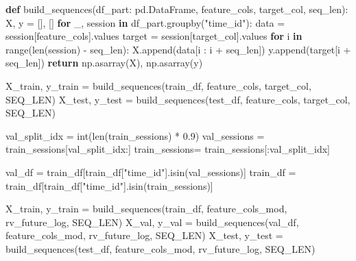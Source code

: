 \documentclass[
  letterpaper,
  DIV=11,
  numbers=noendperiod]{scrartcl}
\newenvironment{Shaded}{\begin{snugshade}}{\end{snugshade}}
\newcommand{\BuiltInTok}[1]{\textcolor[rgb]{0.00,0.23,0.31}{#1}}
\newcommand{\ControlFlowTok}[1]{\textcolor[rgb]{0.00,0.23,0.31}{\textbf{#1}}}
\newcommand{\FloatTok}[1]{\textcolor[rgb]{0.68,0.00,0.00}{#1}}
\newcommand{\KeywordTok}[1]{\textcolor[rgb]{0.00,0.23,0.31}{\textbf{#1}}}
\newcommand{\NormalTok}[1]{\textcolor[rgb]{0.00,0.23,0.31}{#1}}
\newcommand{\OperatorTok}[1]{\textcolor[rgb]{0.37,0.37,0.37}{#1}}
\newcommand{\StringTok}[1]{\textcolor[rgb]{0.13,0.47,0.30}{#1}}
\begin{document}
\begin{Shaded}
\begin{Highlighting}[]
\KeywordTok{def}\NormalTok{ build\_sequences(df\_part: pd.DataFrame, feature\_cols, target\_col, seq\_len):}
\NormalTok{    X, y }\OperatorTok{=}\NormalTok{ [], []}
    \ControlFlowTok{for}\NormalTok{ \_, session }\KeywordTok{in}\NormalTok{ df\_part.groupby(}\StringTok{"time\_id"}\NormalTok{):}
\NormalTok{        data   }\OperatorTok{=}\NormalTok{ session[feature\_cols].values}
\NormalTok{        target }\OperatorTok{=}\NormalTok{ session[target\_col].values}
        \ControlFlowTok{for}\NormalTok{ i }\KeywordTok{in} \BuiltInTok{range}\NormalTok{(}\BuiltInTok{len}\NormalTok{(session) }\OperatorTok{{-}}\NormalTok{ seq\_len):}
\NormalTok{            X.append(data[i : i }\OperatorTok{+}\NormalTok{ seq\_len])}
\NormalTok{            y.append(target[i }\OperatorTok{+}\NormalTok{ seq\_len])}
    \ControlFlowTok{return}\NormalTok{ np.asarray(X), np.asarray(y)}

\NormalTok{X\_train, y\_train }\OperatorTok{=}\NormalTok{ build\_sequences(train\_df, feature\_cols, target\_col, SEQ\_LEN)}
\NormalTok{X\_test,  y\_test  }\OperatorTok{=}\NormalTok{ build\_sequences(test\_df,  feature\_cols, target\_col, SEQ\_LEN)}
\end{Highlighting}
\end{Shaded}

\begin{Shaded}
\begin{Highlighting}[]
\NormalTok{val\_split\_idx }\OperatorTok{=} \BuiltInTok{int}\NormalTok{(}\BuiltInTok{len}\NormalTok{(train\_sessions) }\OperatorTok{*} \FloatTok{0.9}\NormalTok{)}
\NormalTok{val\_sessions  }\OperatorTok{=}\NormalTok{ train\_sessions[val\_split\_idx:]}
\NormalTok{train\_sessions}\OperatorTok{=}\NormalTok{ train\_sessions[:val\_split\_idx]}

\NormalTok{val\_df }\OperatorTok{=}\NormalTok{ train\_df[train\_df[}\StringTok{"time\_id"}\NormalTok{].isin(val\_sessions)]}
\NormalTok{train\_df }\OperatorTok{=}\NormalTok{ train\_df[train\_df[}\StringTok{"time\_id"}\NormalTok{].isin(train\_sessions)]}

\NormalTok{X\_train, y\_train }\OperatorTok{=}\NormalTok{ build\_sequences(train\_df, feature\_cols\_mod, }\StringTok{\textquotesingle{}rv\_future\_log\textquotesingle{}}\NormalTok{, SEQ\_LEN)}
\NormalTok{X\_val,   y\_val   }\OperatorTok{=}\NormalTok{ build\_sequences(val\_df,   feature\_cols\_mod, }\StringTok{\textquotesingle{}rv\_future\_log\textquotesingle{}}\NormalTok{, SEQ\_LEN)}
\NormalTok{X\_test,  y\_test  }\OperatorTok{=}\NormalTok{ build\_sequences(test\_df,  feature\_cols\_mod, }\StringTok{\textquotesingle{}rv\_future\_log\textquotesingle{}}\NormalTok{, SEQ\_LEN)}
\end{Highlighting}
\end{Shaded}
\end{document}
